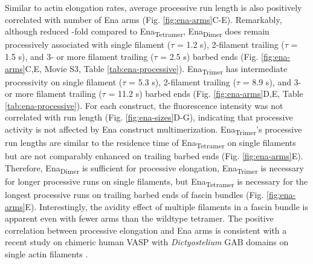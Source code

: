 Similar to actin elongation rates, average processive run length is also positively correlated with number of Ena arms (Fig. \ref{fig:ena-arms}C-E). Remarkably, although reduced -fold compared to Ena\textsubscript{Tetramer}, Ena\textsubscript{Dimer} does remain processively associated with single filament ($\tau$ = 1.2 s), 2-filament trailing ($\tau$ = 1.5 s), and 3- or more filament trailing ($\tau$ = 2.5 s) barbed ends (Fig. \ref{fig:ena-arms}C,E, Movie S3, Table \ref{tab:ena-processive}). Ena\textsubscript{Trimer} has intermediate processivity on single filament ($\tau$ = 5.3 s), 2-filament trailing ($\tau$ = 8.9 s), and 3- or more filament trailing ($\tau$ = 11.2 s) barbed ends (Fig. \ref{fig:ena-arms}D,E, Table \ref{tab:ena-processive}). For each construct, the fluorescence intensity was not correlated with run length (Fig. \ref{fig:ena-sizes}D-G), indicating that processive activity is not affected by Ena construct multimerization. Ena\textsubscript{Trimer}'s processive run lengths are similar to the residence time of Ena\textsubscript{Tetramer} on single filaments but are not comparably enhanced on trailing barbed ends (Fig. \ref{fig:ena-arms}E). Therefore, Ena\textsubscript{Dimer} is sufficient for processive elongation, Ena\textsubscript{Trimer} is necessary for longer processive runs on single filaments, but Ena\textsubscript{Tetramer} is necessary for the longest processive runs on trailing barbed ends of fascin bundles (Fig. \ref{fig:ena-arms}E). Interestingly, the avidity effect of multiple filaments in a fascin bundle is apparent even with fewer arms than the wildtype tetramer. The positive correlation between processive elongation and Ena arms is consistent with a recent study on chimeric human VASP with \textit{Dictyostelium} GAB domains on single actin filaments \citep{bruhmann_distinct_2017}. 

